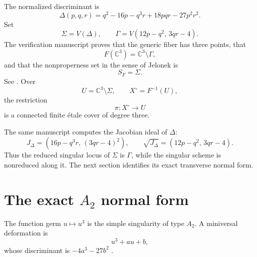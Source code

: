 \documentclass[11pt,reqno]{amsart}
\numberwithin{equation}{section}
\theoremstyle{remark}
\newcommand{\C}{\mathbb C}
\newcommand{\SF}{S_F}
\begin{document}
The normalized discriminant is
\begin{equation}\label{eq:Delta}
\Delta(p,q,r)=q^2-16p-q^3r+18pqr-27p^2r^2.
\end{equation}
Set
\begin{equation}\label{eq:Sigma-Gamma}
\Sigma=V(\Delta),
\qquad
\Gamma=V(12p-q^2,\,3qr-4).
\end{equation}
The verification manuscript proves that the generic fiber has three points, that
\[
F(\C^3)=\C^3\setminus\Gamma,
\]
and that the nonproperness set in the sense of Jelonek \cite{Jelonek1993} is
\begin{equation}\label{eq:nonproperness}
\SF=\Sigma.
\end{equation}
See \cite[Theorems~4.2--4.3]{Counterexample2026}. Over
\[
U=\C^3\setminus\Sigma,
\qquad
X^\circ=F^{-1}(U),
\]
the restriction
\begin{equation}\label{eq:cover}
\pi:X^\circ\longrightarrow U
\end{equation}
is a connected finite étale cover of degree three.

The same manuscript computes the Jacobian ideal of $\Delta$:
\[
J_\Delta=(16p-q^3r,\,(3qr-4)^2),
\qquad
\sqrt{J_\Delta}=(12p-q^2,\,3qr-4).
\]
Thus the reduced singular locus of $\Sigma$ is $\Gamma$, while the singular scheme is nonreduced along it. The next section identifies its exact transverse normal form.

\section{The exact \texorpdfstring{$A_2$}{A2} normal form}

The function germ $u\mapsto u^3$ is the simple singularity of type $A_2$. A miniversal deformation is
\begin{equation}\label{eq:miniversal}
u^3+au+b,
\end{equation}
whose discriminant is $-4a^3-27b^2$ \cite{Arnold1972,Arnold1974}.
\end{document}
